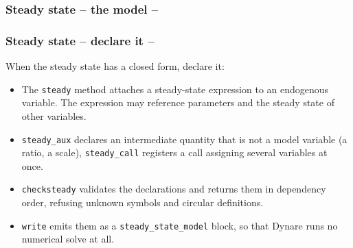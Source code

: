 \documentclass[10pt,slidestop]{beamer}
\theoremstyle{plain}
\begin{document}
\begin{frame}[c,fragile]
  \frametitle{Steady state -- the model --}

  \scalebox{.6}{
  }

\end{frame}



\begin{frame}[c,fragile]
  \frametitle{Steady state -- declare it --}

  When the steady state has a closed form, declare it:

  \begin{itemize}

  \item The \verb+steady+ method attaches a steady-state expression to an
    endogenous variable. The expression may reference parameters and the steady
    state of other variables.\newline

  \item \verb+steady_aux+ declares an intermediate quantity that is not a model
    variable (a ratio, a scale), \verb+steady_call+ registers a call assigning
    several variables at once.\newline

  \item \verb+checksteady+ validates the declarations and returns them in
    dependency order, refusing unknown symbols and circular definitions.\newline

  \item \verb+write+ emits them as a \verb+steady_state_model+ block, so that
    Dynare runs no numerical solve at all.

  \end{itemize}

\end{frame}
\end{document}
